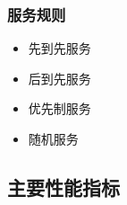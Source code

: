 \subsubsection{服务规则}
\begin{itemize}
	\item 先到先服务
	\item 后到先服务
	\item 优先制服务
	\item 随机服务
\end{itemize}
\subsection{主要性能指标}

